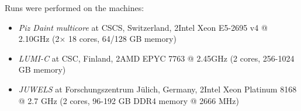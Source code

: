 Runs were performed on the machines:
\begin{itemize}
    \item \emph{Piz Daint multicore} at CSCS, Switzerland, 2\x Intel\textsuperscript{\textregistered} Xeon\textsuperscript{\textregistered} E5-2695 v4 @ 2.10GHz (2$\times$ 18 cores, 64/128 GB memory)
    \item \emph{LUMI-C} at CSC, Finland, 2\x AMD EPYC\textsuperscript{\texttrademark} 7763 @ 2.45GHz (2 cores, 256-1024 GB memory)
    \item \emph{JUWELS} at Forschungszentrum Jülich, Germany, 2\x Intel\textsuperscript{\textregistered} Xeon\textsuperscript{\textregistered} Platinum 8168 @ 2.7 GHz (2 cores, 96-192 GB DDR4 memory @ 2666 MHz)
\end{itemize}



